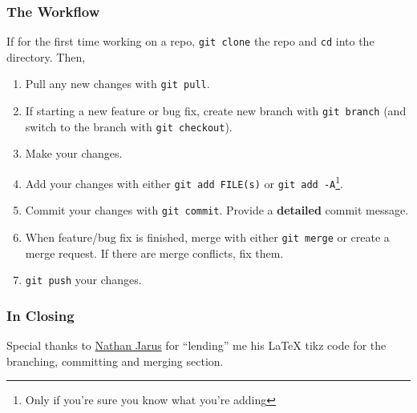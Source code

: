 \documentclass{beamer}
\newcounter{branching}
\newcounter{committing}
\newcounter{merging}
\newcounter{conflicts}
\newcommand{\shellcmd}[1]{\texttt{\colorbox{gray!30}{#1}}}
\begin{document}
\begin{frame}
    \frametitle{The Workflow}

    If for the first time working on a repo, \shellcmd{git clone} the repo and \shellcmd{cd} into the directory. Then,

    \begin{enumerate}
        \item Pull any new changes with \shellcmd{git pull}.
        \item If starting a new feature or bug fix, create new branch with \shellcmd{git branch} (and switch to the branch with \shellcmd{git checkout}).
        \item Make your changes.
        \item Add your changes with either \shellcmd{git add FILE(s)} or \shellcmd{git add -A}\footnote{Only if you're sure you know what you're adding}.
        \item Commit your changes with \shellcmd{git commit}. Provide a \textbf{detailed} commit message.
        \item When feature/bug fix is finished, merge with either \shellcmd{git merge} or create a merge request. If there are merge conflicts, fix them.
        \item \shellcmd{git push} your changes.
    \end{enumerate}

\end{frame}


\begin{frame}
    \frametitle{In Closing}
    Special thanks to \href{http://web.mst.edu/~nmjxv3/}{Nathan Jarus} for ``lending'' me his \LaTeX{} tikz code for the branching, committing and merging section.

\end{frame}
\end{document}
